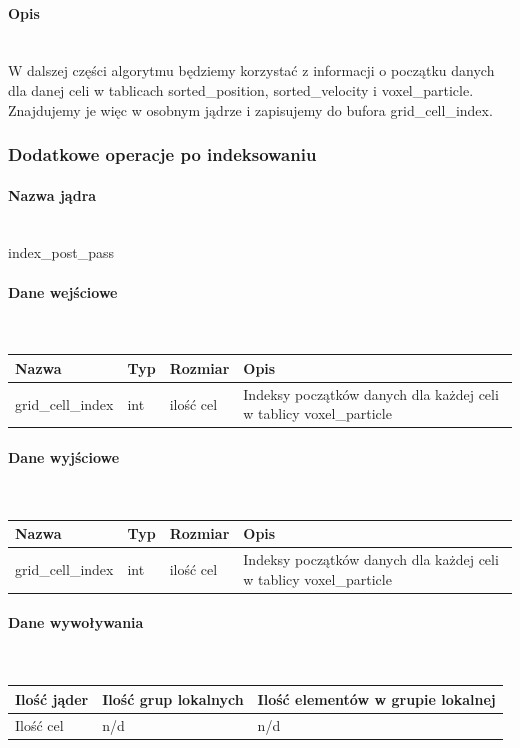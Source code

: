 \documentclass[polish, 12pt]{aghthesis}
\begin{document}
				\paragraph{Opis} \ \\
					\indent W dalszej części algorytmu będziemy korzystać z informacji o początku danych dla danej celi w tablicach sorted\_position, sorted\_velocity i voxel\_particle. Znajdujemy je więc w osobnym jądrze i zapisujemy do bufora grid\_cell\_index.
					
			\subsubsection{Dodatkowe operacje po indeksowaniu}
				\paragraph{Nazwa jądra} \ \\
					index\_post\_pass
				\paragraph{Dane wejściowe} \ \\
					\begin{tabular}{| p{} | p{} | p{} | p{} |}
					\hline
						Nazwa & Typ & Rozmiar & Opis \\
					\hline
						grid\_cell\_index & int & ilość cel & Indeksy początków danych dla każdej celi w tablicy voxel\_particle \\
					\hline
				\end{tabular}
				\paragraph{Dane wyjściowe} \ \\
					\begin{tabular}{| p{} | p{} | p{} | p{} |}
					\hline
						Nazwa & Typ & Rozmiar & Opis \\
					\hline
						grid\_cell\_index & int & ilość cel & Indeksy początków danych dla każdej celi w tablicy voxel\_particle \\
					\hline
				\end{tabular}
				\paragraph{Dane wywoływania} \ \\
					\begin{tabular}{| p{} | p{} | p{}|}
					\hline
						Ilość jąder & Ilość grup lokalnych & Ilość elementów w grupie lokalnej \\
					\hline
						Ilość cel & n/d & n/d \\ 
					\hline
					\end{tabular}
\end{document}
